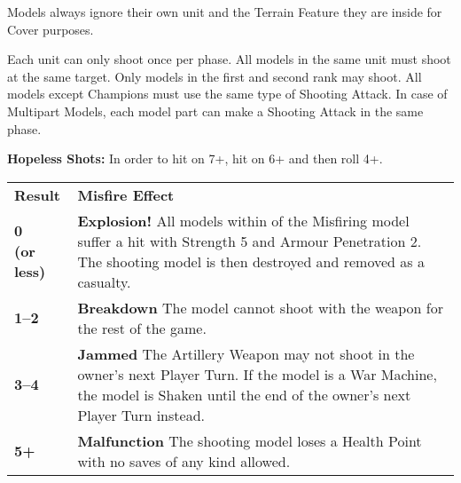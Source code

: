 \documentclass[a4paper,10pt]{article}
\begin{document}
\begin{minipage}[t]{0.485\textwidth}
Models always ignore their own unit and the Terrain Feature they are inside for Cover purposes.

\end{minipage}\hfill\begin{minipage}[t]{0.485\textwidth}


Each unit can only shoot once per phase. All models in the same unit must shoot at the same target. Only models in the first and second rank may shoot. All \rnf{} models except Champions must use the same type of Shooting Attack. In case of Multipart Models, each model part can make a Shooting Attack in the same phase.

\textbf{Hopeless Shots:} In order to hit on 7+, hit on 6+ and then roll 4+.


\begin{center}\alternaterowcolors
\begin{tabular}{M{1.4cm}m{\textwidth -1.4cm - 24pt}}
\hline
\textbf{Result} & \centering\textbf{Misfire Effect} \tabularnewline
\textbf{0\newline (or less)} & \textbf{Explosion!}\vspace*{3pt}\newline
All models within  of the Misfiring model suffer a hit with Strength 5 and Armour Penetration 2. The shooting model is then destroyed and removed as a casualty. \tabularnewline
\textbf{1--2} & \textbf{Breakdown}\vspace*{3pt}\newline
The model cannot shoot with the weapon for the rest of the game. \tabularnewline
\textbf{3--4} & \textbf{Jammed}\vspace*{3pt}\newline
The Artillery Weapon may not shoot in the owner's next Player Turn. If the model is a War Machine, the model is Shaken until the end of the owner's next Player Turn instead.\tabularnewline
\textbf{5+} & \textbf{Malfunction}\vspace*{3pt}\newline
The shooting model loses a Health Point with no saves of any kind allowed. \tabularnewline
\hline
\end{tabular}
\end{center}

\end{minipage}
\end{document}
